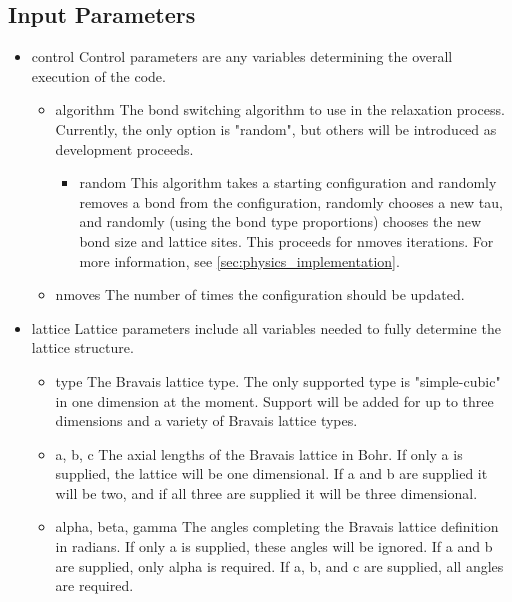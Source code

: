 \subsection{Input Parameters}
\begin{itemize}
  \item{control}
    Control parameters are any variables determining the overall execution of 
    the code. 
    \begin{itemize}
      \item{algorithm}
        The bond switching algorithm to use in the relaxation process.
        Currently, the only option is "random", but others will be introduced
        as development proceeds.
        \begin{itemize}
          \item{random}
            This algorithm takes a starting configuration and randomly removes
            a bond from the configuration, randomly chooses a new tau, and 
            randomly (using the bond type proportions) chooses the new bond
            size and lattice sites.
            This proceeds for nmoves iterations.
            For more information, see \ref{sec:physics_implementation}.
        \end{itemize}
      \item{nmoves}
        The number of times the configuration should be updated.
    \end{itemize}
  \item{lattice}
    Lattice parameters include all variables needed to fully determine the 
    lattice structure. 
    \begin{itemize}
      \item{type}
        The Bravais lattice type. 
        The only supported type is "simple-cubic" in one dimension at the 
        moment. 
        Support will be added for up to three dimensions and a variety of 
        Bravais lattice types.
      \item{a, b, c}
        The axial lengths of the Bravais lattice in Bohr.
        If only a is supplied, the lattice will be one dimensional.
        If a and b are supplied it will be two, and if all three are 
        supplied it will be three dimensional. 
      \item{alpha, beta, gamma}
        The angles completing the Bravais lattice definition in radians. 
        If only a is supplied, these angles will be ignored.
        If a and b are supplied, only alpha is required. 
        If a, b, and c are supplied, all angles are required.

\end{itemize}
\end{itemize}
